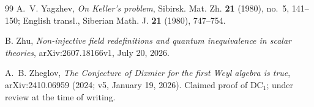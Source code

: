 \documentclass[11pt]{amsart}
\newcommand{\DC}{\mathrm{DC}}
\theoremstyle{plain}
\theoremstyle{definition}
\theoremstyle{remark}
\begin{document}
\begin{thebibliography}{99}
A.~V. Yagzhev,
\emph{On Keller's problem},
Sibirsk. Mat. Zh. \textbf{21} (1980), no.~5, 141--150; English transl.,
Siberian Math. J. \textbf{21} (1980), 747--754.

B. Zhu,
\emph{Non-injective field redefinitions and quantum inequivalence in
scalar theories},
arXiv:2607.18166v1, July 20, 2026.

A.~B. Zheglov,
\emph{The Conjecture of Dixmier for the first Weyl algebra is true},
arXiv:2410.06959 (2024; v5, January 19, 2026). Claimed proof of
$\DC_{1}$; under review at the time of writing.

\end{thebibliography}
\end{document}
